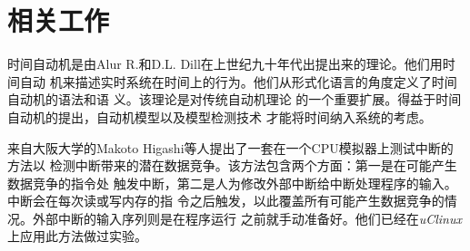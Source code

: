 
\chapter{相关工作}
\label{cha:related_work}


时间自动机是由Alur R.和D.L. Dill在上世纪九十年代出提出来的理论。他们用时间自动
机来描述实时系统在时间上的行为。他们从形式化语言的角度定义了时间自动机的语法和语
义\cite{Alur:1994:TTA:180782.180519}。该理论是对传统自动机理论\cite{Hopcroft:2006:IAT:1196416}
的一个重要扩展。得益于时间自动机的提出，自动机模型以及模型检测技术\cite{Clarke:2000:MC:332656}
才能将时间纳入系统的考虑。

来自大阪大学的Makoto Higashi等人提出了一套在一个CPU模拟器上测试中断的方法以
检测中断带来的潜在数据竞争。该方法包含两个方面：第一是在可能产生数据竞争的指令处
触发中断，第二是人为修改外部中断给中断处理程序的输入。中断会在每次读或写内存的指
令之后触发，以此覆盖所有可能产生数据竞争的情况。外部中断的输入序列则是在程序运行
之前就手动准备好。他们已经在\emph{uClinux}上应用此方法做过实验。\cite{Higashi:2010:EMC:1808266.1808278}

